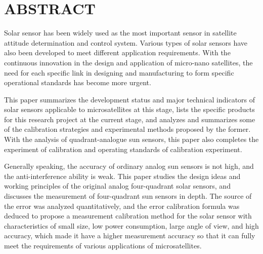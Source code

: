 ﻿
\renewcommand{\baselinestretch}{1.5}
\fontsize{12pt}{13pt}\selectfont

\chapter*{ABSTRACT}
\noindent 
\vspace{1em}


Solar sensor has been widely used as the most important sensor in satellite attitude
determination and control system. Various types of solar sensors have also been developed
to meet different application requirements.
With the continuous innovation in the design and application of micro-nano satellites, 
the need for each specific link in designing and manufacturing to form specific operational
standards has become more urgent.

This paper summarizes the development status and major technical indicators of solar sensors
applicable to microsatellites at this stage, lists the specific products for this research
project at the current stage, and analyzes and summarizes some of the calibration strategies
and experimental methods proposed by the former. With the analysis of quadrant-analogue sun sensors,
this paper also completes the experiment of calibration and operating standards of calibration experiment.

Generally speaking, the accuracy of ordinary analog sun sensors is not high, and the anti-interference
ability is weak. This paper studies the design ideas and working principles of the original analog four-quadrant
solar sensors, and discusses the measurement of four-quadrant sun sensors in depth. The source of the error was
analyzed quantitatively, and the error calibration formula was deduced to propose a measurement calibration
method for the solar sensor with characteristics of small size, low power consumption, large angle of view, 
and high accuracy, which made it have a higher measurement accuracy so that it can fully meet the requirements
of various applications of microsatellites.

\vspace{0.1in}
